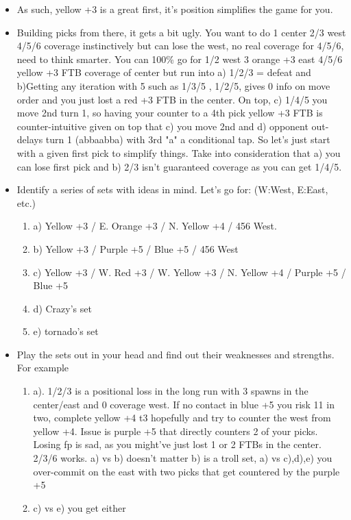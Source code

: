 \begin{itemize}
    \item As such, yellow +3 is a great first, it's position simplifies the game for you. 
    \item Building picks from there, it gets a bit ugly. You want to do 1 center 2/3 west 4/5/6 coverage instinctively but can lose the west, no real coverage for 4/5/6, need to think smarter. You can 100\% go for 1/2 west 3 orange +3 east 4/5/6 yellow +3 FTB coverage of center but run into a) 1/2/3 = defeat and b)Getting any iteration with 5 such as 1/3/5 , 1/2/5, gives 0 info on move order and you just lost a red +3 FTB in the center. On top, c) 1/4/5 you move 2nd turn 1, so having your counter to a 4th pick yellow +3 FTB is counter-intuitive given on top that c) you move 2nd and d) opponent out-delays turn 1 (abbaabba) with 3rd "a" a conditional tap. So let's just start with a given first pick to simplify things. Take into consideration that a) you can lose first pick and b) 2/3 isn't guaranteed coverage as you can get 1/4/5.
    \item Identify a series of sets with ideas in mind. Let's go for: (W:West, E:East, etc.)
    \begin{enumerate}
        \item a) Yellow +3 / E. Orange +3 / N. Yellow +4 / 456 West.
        \item b) Yellow +3 / Purple +5 / Blue +5 / 456 West
        \item c) Yellow +3 / W. Red +3 / W. Yellow +3 / N. Yellow +4 / Purple +5 / Blue +5
        \item d) Crazy's set
        \item e) tornado's set
    \end{enumerate}
    \item Play the sets out in your head and find out their weaknesses and strengths. For example
    \begin{enumerate}
        \item a). 1/2/3 is a positional loss in the long run with 3 spawns in the center/east and 0 coverage west. If no contact in blue +5 you risk 11 in two, complete yellow +4 t3 hopefully and try to counter the west from yellow +4. Issue is purple +5 that directly counters 2 of your picks. Losing fp is sad, as you might've just lost 1 or 2 FTBs in the center. 2/3/6 works. a) vs b) doesn't matter b) is a troll set, a) vs c),d),e) you over-commit on the east with two picks that get countered by the purple +5
        \item c) vs e) you get either 
        \begin{itemize}

\end{itemize}
\end{enumerate}
\end{itemize}
